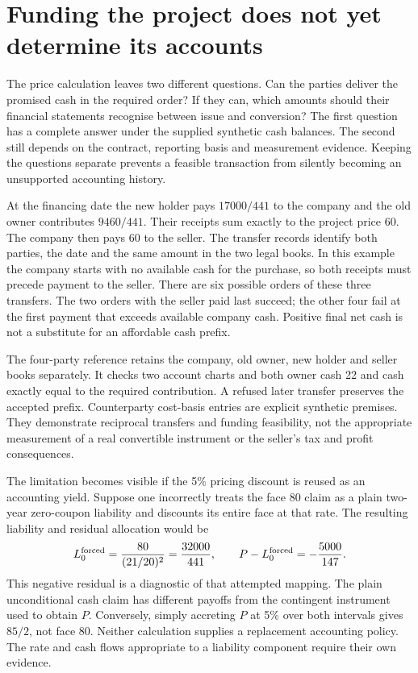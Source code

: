 
\section{Funding the project does not yet determine its accounts}
\label{sim:funding-measurement-control}
The price calculation leaves two different questions. Can the parties deliver
the promised cash in the required order? If they can, which amounts should
their financial statements recognise between issue and conversion? The first
question has a complete answer under the supplied synthetic cash balances.
The second still depends on the contract, reporting basis and measurement
evidence. Keeping the questions separate prevents a feasible transaction from
silently becoming an unsupported accounting history.

At the financing date the new holder pays $17000/441$ to the company and the
old owner contributes $9460/441$. Their receipts sum exactly to the project
price 60. The company then pays 60 to the seller. The transfer records identify
both parties, the date and the same amount in the two legal books. In this
example the company starts with no available cash for the purchase, so both
receipts must precede payment to the seller. There are six possible orders of
these three transfers. The two orders with the seller paid last succeed; the
other four fail at the first payment that exceeds available company cash.
Positive final net cash is not a substitute for an affordable cash prefix.

The four-party reference retains the company, old owner, new holder and seller
books separately. It checks two account charts and both owner cash 22 and cash
exactly equal to the required contribution. A refused later transfer preserves
the accepted prefix. Counterparty cost-basis entries are explicit synthetic
premises. They demonstrate reciprocal transfers and funding feasibility, not
the appropriate measurement of a real convertible instrument or the seller's
tax and profit consequences.

The limitation becomes visible if the 5\% pricing discount is reused as an
accounting yield. Suppose one incorrectly treats the face 80 claim as a plain
two-year zero-coupon liability and discounts its entire face at that rate.
The resulting liability and residual allocation would be
\begin{equation}
 L_0^{\rm forced}=\frac{80}{(21/20)^2}=\frac{32000}{441},
 \qquad P-L_0^{\rm forced}=-\frac{5000}{147}.
 \label{sim:forced-conversion-measurement}
\end{equation}
This negative residual is a diagnostic of that attempted mapping. The plain
unconditional cash claim has different payoffs from the contingent instrument
used to obtain $P$. Conversely, simply accreting $P$ at 5\% over both intervals
gives $85/2$, not face 80. Neither calculation supplies a replacement accounting
policy. The rate and cash flows appropriate to a liability component require
their own evidence.

